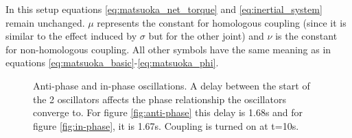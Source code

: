 \documentclass[12pt,twoside]{article}
\theoremstyle{plain}
\theoremstyle{definition}
\theoremstyle{remark}
\begin{document}
\begin{enumerate}
In this setup equations \ref{eq:matsuoka_net_torque} and  \ref{eq:inertial_system} remain unchanged. $\mu$ represents the constant for homologous coupling (since it is similar to the effect induced by $\sigma$ but for the other joint) and $\nu$ is the constant for non-homologous coupling. All other symbols have the same meaning as in equations  \ref{eq:matsuoka_basic}-\ref{eq:matsuoka_phi}.
\end{enumerate}

\begin{figure}[htbp]
\centering     %
{}
\caption{Anti-phase and in-phase oscillations. A delay between the start of the 2 oscillators affects the phase relationship the oscillators converge to. For figure \ref{fig:anti-phase} this delay is 1.68s and for figure \ref{fig:in-phase}, it is 1.67s. Coupling is turned on at t=10s.}
\label{fig:in-anti-phase}
\end{figure}
\end{document}
